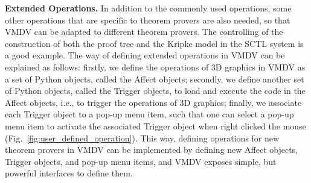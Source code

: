 \documentclass[runningheads]{llncs}
\newcommand\tool[1]{\textsf{#1}}
\newcommand\vmdv{\tool{VMDV}}
\begin{document}
{\color{blue} 
\vspace{0.1cm}
\hspace{-0.5cm}
{\bf Extended Operations.}
In addition to the commonly used operations, some other operations that are specific to theorem provers are also needed, so that \vmdv{} can be adapted to different theorem provers. The controlling of the construction of both the proof tree and the Kripke model in the \textsf{SCTL} system is a good example. 
The way of defining extended operations in \vmdv{} can be explained as follows: firstly, we define the operations of 3D graphics in \tool{VMDV} as a set of \tool{Python} objects, called the \textsf{Affect} objects; secondly, we define another set of \tool{Python} objects, called the \textsf{Trigger} objects, to load and execute the code in the \textsf{Affect} objects, i.e., to trigger the operations of 3D graphics; finally, we associate each \textsf{Trigger} object to a pop-up menu item, such that one can select a pop-up menu item to activate the associated \textsf{Trigger} object when right clicked the mouse (Fig.~\ref{fig:user_defined_operation}).
This way, defining operations for new theorem provers in \vmdv{} can be implemented by defining new \textsf{Affect} objects, \textsf{Trigger} objects, and pop-up menu items, and \vmdv{} exposes simple, but powerful interfaces to define them.


 

} 
 
\end{document}
